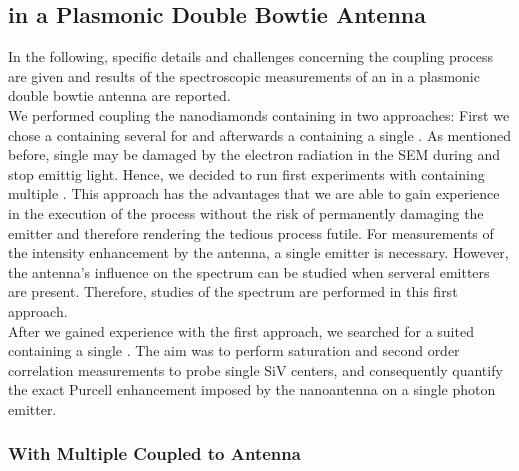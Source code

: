 	\subsection{\siv in a Plasmonic Double Bowtie Antenna}


		In the following, specific details and challenges concerning the coupling process are given and results of the spectroscopic measurements of an \siv in a plasmonic double bowtie antenna are reported.
		\\
		We performed coupling the nanodiamonds containing \sivs in two approaches:
		First we chose a \nd containing several \sivs for \pp and afterwards a \nd containing a single \siv.
		As mentioned before, single \sivs may be damaged by the electron radiation in the SEM during \pp and stop emittig \pl light.
		Hence, we decided to run first experiments with \nds containing multiple \sivs. 
		This approach has the advantages that we are able to gain experience in the execution of the \pp process without the risk of permanently damaging the emitter and therefore rendering the tedious \pp process futile. 
		For measurements of the intensity enhancement by the antenna, a single emitter is necessary.
		However, the antenna's influence on the \siv spectrum can be studied when serveral emitters are present.
		Therefore, studies of the spectrum are performed in this first approach.
		\\
		After we gained experience with the first approach, we  searched for a suited \nd containing a single \siv.
		The aim was to perform saturation and second order correlation measurements to probe single SiV centers, and consequently quantify the exact Purcell enhancement imposed by the nanoantenna on a single photon emitter.



		\subsubsection{\Nd With Multiple \sivs Coupled to Antenna}\label{subsubsection::antenna_multiple_sivs}

